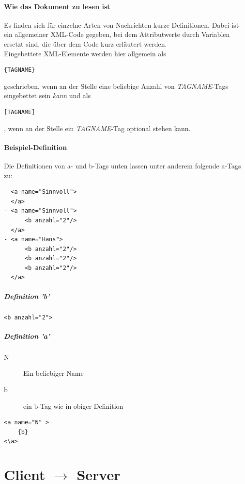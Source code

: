 \documentclass[12pt,a4paper, ngerman, oneside]{scrartcl}
\begin{document}
\subsection*{Wie das Dokument zu lesen ist}
Es finden sich für einzelne Arten von Nachrichten kurze Definitionen. Dabei ist ein allgemeiner XML-Code gegeben, bei dem Attributwerte durch Variablen ersetzt sind, die über dem Code kurz erläutert werden.\\
Eingebettete XML-Elemente werden hier allgemein als \begin{verbatim}
{TAGNAME}
\end{verbatim} geschrieben, wenn an der Stelle eine beliebige Anzahl von \textit{TAGNAME}-Tags eingebettet sein \textit{kann} und als \begin{verbatim}
[TAGNAME]
\end{verbatim}, wenn an der Stelle ein \textit{TAGNAME}-Tag optional stehen kann. \\

\subsection{Beispiel-Definition}
Die Definitionen von a- und b-Tags unten lassen unter anderem folgende a-Tags zu:
\begin{verbatim}
- <a name="Sinnvoll">
  </a>
- <a name="Sinnvoll">
      <b anzahl="2"/>
  </a>
- <a name="Hans">
      <b anzahl="2"/>
      <b anzahl="2"/>
      <b anzahl="2"/>
  </a>
\end{verbatim}
\subsubsection*{Definition 'b'}
\begin{verbatim}
<b anzahl="2">
\end{verbatim}
\subsubsection*{Definition 'a'}
\begin{description}
\item[N] Ein beliebiger Name
\item[b] ein b-Tag wie in obiger Definition
\end{description}
\begin{verbatim}
<a name="N" >
	{b}
<\a>
\end{verbatim}

\newpage
\part{Client $\rightarrow$ Server}
\end{document}
